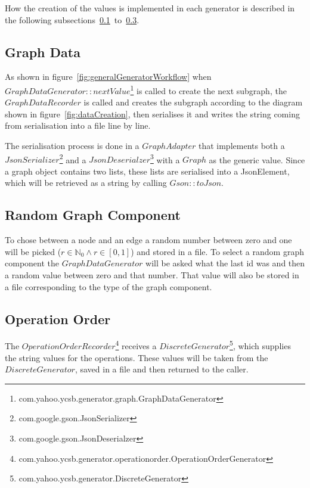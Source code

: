How the creation of the values is implemented in each generator is described in the following subsections~\ref{ch:implementation:se:graphDataRecorder}~to~\ref{ch:implementation:se:operationOrderRecorder}.

\subsection{Graph Data}
\label{ch:implementation:se:graphDataRecorder}
As shown in figure~\ref{fig:generalGeneratorWorkflow} when $ GraphDataGenerator::nextValue $\footnote{com.yahoo.ycsb.generator.graph.GraphDataGenerator} is called to create the next subgraph,
the $ GraphDataRecorder $ is called and creates the subgraph according to the diagram shown in figure~\ref{fig:dataCreation},
then serialises it and writes the string coming from serialisation into a file line by line.

The serialisation process is done in a $ GraphAdapter $ that implements both a $ JsonSerializer $\footnote{com.google.gson.JsonSerializer} and a $ JsonDeserialzer $\footnote{com.google.gson.JsonDeserialzer} with a $ Graph $ as the generic value.
Since a graph object contains two lists,
these lists are serialised into a JsonElement,
which will be retrieved as a string by calling $ Gson::toJson $.

\subsection{Random Graph Component}
To chose between a node and an edge a random number between zero and one will be picked ($ r \in \mathbb{N}_0 \wedge r \in [ 0, 1 ] $) and stored in a file.
To select a random graph component the $ GraphDataGenerator $ will be asked what the last id was and then a random value between zero and that number.
That value will also be stored in a file corresponding to the type of the graph component.

\subsection{Operation Order}
\label{ch:implementation:se:operationOrderRecorder}
The $ OperationOrderRecorder $\footnote{com.yahoo.ycsb.generator.operationorder.OperationOrderGenerator} receives a $ DiscreteGenerator $\footnote{com.yahoo.ycsb.generator.DiscreteGenerator},
which supplies the string values for the operations.
These values will be taken from the $ DiscreteGenerator $,
saved in a file and then returned to the caller.

